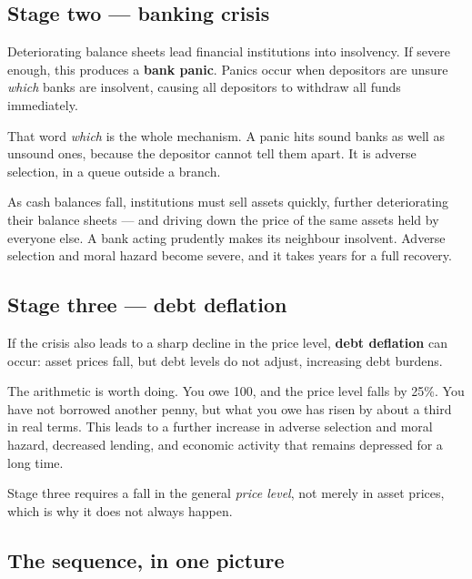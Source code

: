 \documentclass[11pt,a4paper]{article}
\begin{document}
\subsection*{Stage two --- banking crisis}

Deteriorating balance sheets lead financial institutions into insolvency. If
severe enough, this produces a \textbf{bank panic}. Panics occur when depositors
are unsure \emph{which} banks are insolvent, causing all depositors to withdraw
all funds immediately.

That word \emph{which} is the whole mechanism. A panic hits sound banks as well
as unsound ones, because the depositor cannot tell them apart. It is adverse
selection, in a queue outside a branch.

As cash balances fall, institutions must sell assets quickly, further
deteriorating their balance sheets --- and driving down the price of the same
assets held by everyone else. A bank acting prudently makes its neighbour
insolvent. Adverse selection and moral hazard become severe, and it takes years
for a full recovery.

\subsection*{Stage three --- debt deflation}

If the crisis also leads to a sharp decline in the price level, \textbf{debt
deflation} can occur: asset prices fall, but debt levels do not adjust,
increasing debt burdens.

The arithmetic is worth doing. You owe 100, and the price level falls by 25\%.
You have not borrowed another penny, but what you owe has risen by about a third
in real terms. This leads to a further increase in adverse selection and moral
hazard, decreased lending, and economic activity that remains depressed for a
long time.

Stage three requires a fall in the general \emph{price level}, not merely in
asset prices, which is why it does not always happen.

\subsection*{The sequence, in one picture}
\end{document}
